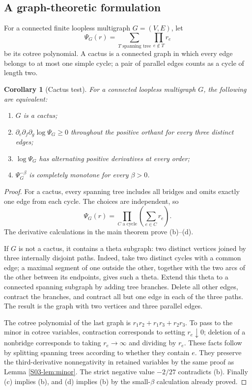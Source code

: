\documentclass[11pt,a4paper]{article}
\newtheorem{corollary}[theorem]{Corollary}
\theoremstyle{definition}\newtheorem{definition}[theorem]{Definition}
\theoremstyle{remark}\newtheorem{remark}[theorem]{Remark}
\numberwithin{equation}{section}
\begin{document}
\subsection{A graph-theoretic formulation}\label{S03-sec-4}
For a connected finite loopless multigraph $G=(V,E)$, let
\[
 \Psi_G(r)=\sum_{T\text{ spanning tree}}\prod_{e\notin T}r_e
\]
be its cotree polynomial. A cactus is a connected graph in which every edge belongs to at most one simple cycle; a pair of parallel edges counts as a cycle of length two.

\begin{corollary}[Cactus test]\label{S03-cor:cactus}
For a connected loopless multigraph $G$, the following are equivalent:
\begin{enumerate}[label=(\alph*)]
 \item $G$ is a cactus;
 \item $\partial_e\partial_f\partial_g\log\Psi_G\ge0$ throughout the positive orthant for every three distinct edges;
 \item $\log\Psi_G$ has alternating positive derivatives at every order;
 \item $\Psi_G^{-\beta}$ is completely monotone for every $\beta>0$.
\end{enumerate}
\end{corollary}
\begin{proof}
For a cactus, every spanning tree includes all bridges and omits exactly one edge from each cycle. The choices are independent, so
\[
 \Psi_G(r)=\prod_{C\text{ a cycle}}\left(\sum_{e\in C}r_e\right).
\]
The derivative calculations in the main theorem prove (b)--(d).

If $G$ is not a cactus, it contains a theta subgraph: two distinct vertices joined by three internally disjoint paths. Indeed, take two distinct cycles with a common edge; a maximal segment of one outside the other, together with the two arcs of the other between its endpoints, gives such a theta. Extend this theta to a connected spanning subgraph by adding tree branches. Delete all other edges, contract the branches, and contract all but one edge in each of the three paths. The result is the graph with two vertices and three parallel edges.

The cotree polynomial of the last graph is $r_1r_2+r_1r_3+r_2r_3$. To pass to the minor in cotree variables, contraction corresponds to setting $r_e\downarrow0$; deletion of a nonbridge corresponds to taking $r_e\to\infty$ and dividing by $r_e$. These facts follow by splitting spanning trees according to whether they contain $e$. They preserve the third-derivative nonnegativity in retained variables by the same proof as Lemma \ref{S03-lem:minor}. The strict negative value $-2/27$ contradicts (b). Finally (c) implies (b), and (d) implies (b) by the small-$\beta$ calculation already proved.
\end{proof}
\end{document}
